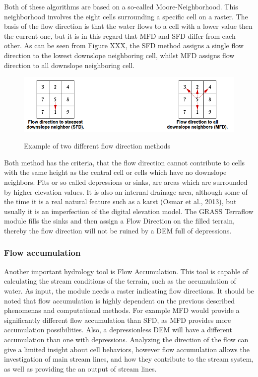 Both of these algorithms are based on a so-called Moore-Neighborhood. This neighborhood involves the eight cells surrounding a specific cell on a raster. The basis of the flow direction is that the water flows to a cell with a lower value then the current one, but it is in this regard that MFD and SFD differ from each other. As can be seen from Figure XXX, the SFD method assigns a single flow direction to the lowest downslope neighboring cell, whilst MFD assigns flow direction to all downslope neighboring cell. \\

\begin{figure}[t]
\centering
	{\includegraphics[width=\linewidth]{gfx/SFD_MFD.png}}
\caption{Example of two different flow direction methods}
\end{figure}

Both method has the criteria, that the flow direction cannot contribute to cells with the same height as the central cell or cells which have no downslope neighbors.
Pits or so called depressions or sinks, are areas which are surrounded by higher elevation values. It is also an internal drainage area, although some of the time it is a real natural feature such as a karst (Osmar et al., 2013), but usually it is an imperfection of the digital elevation model.  The GRASS Terraflow module fills the sinks and then assign a Flow Direction on the filled terrain, thereby the flow direction will not be ruined by a DEM full of depressions. 

\subsubsection{Flow accumulation}
Another important hydrology tool is Flow Accumulation. This tool is capable of calculating the stream conditions of the terrain, such as the accumulation of water. As input, the module needs a raster indicating flow directions. It should be noted that flow accumulation is highly dependent on the previous described phenomenas and computational methods. For example MFD would provide a significantly different flow accumulation than SFD, as MFD provides more accumulation possibilities. Also, a depressionless DEM will have a different accumulation than one with depressions. Analyzing the direction of the flow can give a limited insight about cell behaviors, however flow accumulation allows the investigation of main stream lines, and how they contribute to the stream system, as well as providing the an output of stream lines.

